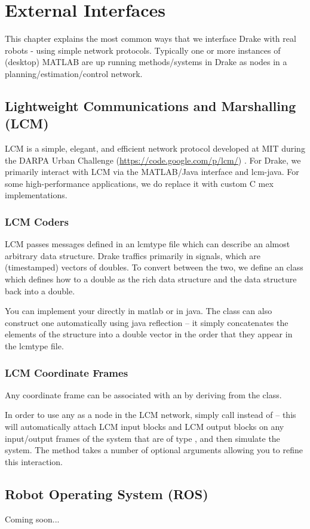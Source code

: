 \chapter{External Interfaces}

This chapter explains the most common ways that we interface Drake
with real robots - using simple network protocols.  Typically one or
more instances of (desktop) MATLAB are up running methods/systems in Drake as
nodes in a planning/estimation/control network.

\section{Lightweight Communications and Marshalling (LCM)}

LCM is a simple, elegant, and efficient network protocol developed at
MIT during the DARPA Urban Challenge
(\url{https://code.google.com/p/lcm/}) \cite{Huang10}.  For Drake, we
primarily interact with LCM via the MATLAB/Java interface and
lcm-java.  For some high-performance applications, we do replace it
with custom C mex implementations.

\subsection{LCM Coders}

LCM passes messages defined in an lcmtype file which can describe an
almost arbitrary data structure.  Drake traffics primarily in signals,
which are (timestamped) vectors of doubles.  To convert between the two, we define
an  class which defines how to  a double
as the rich data structure and  the data structure back
into a double.

You can implement your  directly in matlab or in java.
The  class can also construct one
automatically using java reflection -- it simply concatenates the
elements of the structure into a double vector in the order that they
appear in the lcmtype file.  
 
\subsection{LCM Coordinate Frames}

Any coordinate frame can be associated with an  by deriving
from the  class. 

In order to use any  as a node in the LCM
network, simply call  instead of
 -- this will automatically attach LCM input blocks
and LCM output blocks on any input/output frames of the system that
are of type , and then simulate the system.
The  method takes a number of optional arguments
allowing you to refine this interaction.

\section{Robot Operating System (ROS)}

Coming soon...